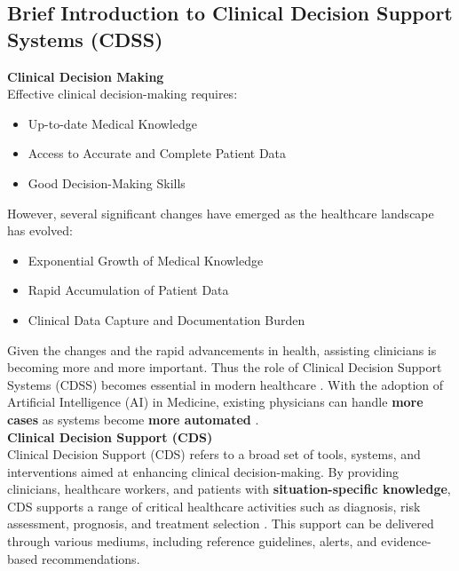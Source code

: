 \subsection{Brief Introduction to Clinical Decision Support Systems (CDSS)}
\textcolor{TUMBlue}{\textbf{Clinical Decision Making}}\\
\noindent Effective clinical decision-making requires:
\begin{itemize}
    \item Up-to-date Medical Knowledge
    \item Access to Accurate and Complete Patient Data
    \item Good Decision-Making Skills
\end{itemize}
\noindent However, several significant changes have emerged as the healthcare landscape has evolved:
\begin{itemize}
    \item Exponential Growth of Medical Knowledge
    \item Rapid Accumulation of Patient Data
    \item Clinical Data Capture and Documentation Burden
\end{itemize}

\noindent Given the changes and the rapid advancements in health, assisting clinicians is becoming more and more important. Thus the role of Clinical Decision Support Systems (CDSS) becomes essential in modern healthcare \cite{visweswaran2022integration}. With the adoption of Artificial Intelligence (AI) in Medicine, existing physicians can handle \textcolor{TUMBlue}{\textbf{more cases}} as systems become \textcolor{TUMBlue}{\textbf{more automated}} \cite{panch2018artificial}.\\[\baselineskip]

\noindent \textcolor{TUMBlue}{\textbf{Clinical Decision Support (CDS)}}\\
\noindent Clinical Decision Support (CDS) refers to a broad set of tools, systems, and interventions aimed at enhancing clinical decision-making. By providing clinicians, healthcare workers, and patients with \textcolor{TUMRed}{\textbf{situation-specific knowledge}}, CDS supports a range of critical healthcare activities such as diagnosis, risk assessment, prognosis, and treatment selection \cite{osheroff2007roadmap}. This support can be delivered through various mediums, including reference guidelines, alerts, and evidence-based recommendations.\\[\baselineskip]

